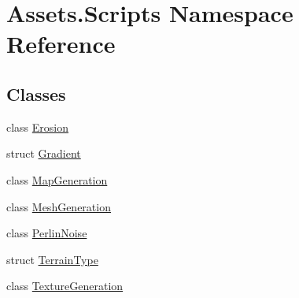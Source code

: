 \hypertarget{namespace_assets_1_1_scripts}{}\section{Assets.\+Scripts Namespace Reference}
\label{namespace_assets_1_1_scripts}
\subsection*{Classes}
\begin{DoxyCompactItemize}
\item 
class \mbox{\hyperlink{class_assets_1_1_scripts_1_1_erosion}{Erosion}}
\item 
struct \mbox{\hyperlink{struct_assets_1_1_scripts_1_1_gradient}{Gradient}}
\item 
class \mbox{\hyperlink{class_assets_1_1_scripts_1_1_map_generation}{Map\+Generation}}
\item 
class \mbox{\hyperlink{class_assets_1_1_scripts_1_1_mesh_generation}{Mesh\+Generation}}
\item 
class \mbox{\hyperlink{class_assets_1_1_scripts_1_1_perlin_noise}{Perlin\+Noise}}
\item 
struct \mbox{\hyperlink{struct_assets_1_1_scripts_1_1_terrain_type}{Terrain\+Type}}
\item 
class \mbox{\hyperlink{class_assets_1_1_scripts_1_1_texture_generation}{Texture\+Generation}}
\end{DoxyCompactItemize}
